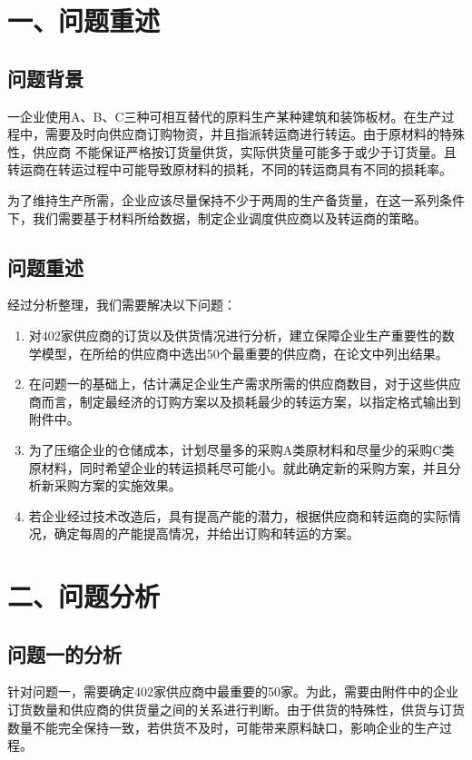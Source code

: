 \documentclass{my_paper}
\begin{document}
\newpage
\section{一、问题重述}

\subsection{问题背景}

一企业使用A、B、C三种可相互替代的原料生产某种建筑和装饰板材。在生产过程中，需要及时向供应商订购物资，并且指派转运商进行转运。由于原材料的特殊性，供应商
不能保证严格按订货量供货，实际供货量可能多于或少于订货量。且转运商在转运过程中可能导致原材料的损耗，不同的转运商具有不同的损耗率。

为了维持生产所需，企业应该尽量保持不少于两周的生产备货量，在这一系列条件下，我们需要基于材料所给数据，制定企业调度供应商以及转运商的策略。

\subsection{问题重述}
经过分析整理，我们需要解决以下问题：
\begin{enumerate}
    \item 对402家供应商的订货以及供货情况进行分析，建立保障企业生产重要性的数学模型，在所给的供应商中选出50个最重要的供应商，在论文中列出结果。
    \item 在问题一的基础上，估计满足企业生产需求所需的供应商数目，对于这些供应商而言，制定最经济的订购方案以及损耗最少的转运方案，以指定格式输出到附件中。
    \item 为了压缩企业的仓储成本，计划尽量多的采购A类原材料和尽量少的采购C类原材料，同时希望企业的转运损耗尽可能小。就此确定新的采购方案，并且分析新采购方案的实施效果。
    \item 若企业经过技术改造后，具有提高产能的潜力，根据供应商和转运商的实际情况，确定每周的产能提高情况，并给出订购和转运的方案。
\end{enumerate}
\section{二、问题分析}
\subsection{问题一的分析}

针对问题一，需要确定402家供应商中最重要的50家。为此，需要由附件中的企业订货数量和供应商的供货量之间的关系进行判断。由于供货的特殊性，供货与订货数量不能完全保持一致，若供货不及时，可能带来原料缺口，影响企业的生产过程。
\end{document}
